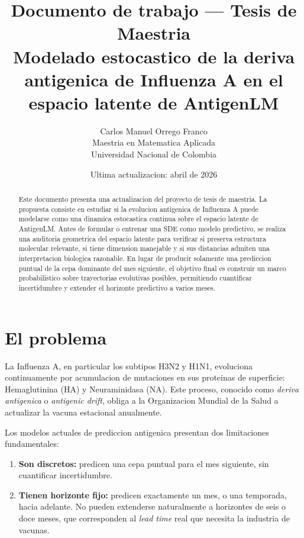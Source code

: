 \documentclass[12pt,letterpaper]{article}
\title{\textbf{Documento de trabajo --- Tesis de Maestria}\\[0.4em]
\large Modelado estocastico de la deriva antigenica de Influenza A en el espacio latente de AntigenLM}
\author{Carlos Manuel Orrego Franco\\
Maestria en Matematica Aplicada\\
Universidad Nacional de Colombia}
\date{Ultima actualizacion: abril de 2026}
\begin{document}
\maketitle

\begin{abstract}
Este documento presenta una actualizacion del proyecto de tesis de maestria. La propuesta consiste en estudiar si la evolucion antigenica de Influenza A puede modelarse como una dinamica estocastica continua sobre el espacio latente de AntigenLM. Antes de formular o entrenar una SDE como modelo predictivo, se realiza una auditoria geometrica del espacio latente para verificar si preserva estructura molecular relevante, si tiene dimension manejable y si sus distancias admiten una interpretacion biologica razonable. En lugar de producir solamente una prediccion puntual de la cepa dominante del mes siguiente, el objetivo final es construir un marco probabilistico sobre trayectorias evolutivas posibles, permitiendo cuantificar incertidumbre y extender el horizonte predictivo a varios meses.
\end{abstract}

\tableofcontents
\newpage

\section{El problema}

La Influenza A, en particular los subtipos H3N2 y H1N1, evoluciona continuamente por acumulacion de mutaciones en sus proteinas de superficie: Hemaglutinina (HA) y Neuraminidasa (NA). Este proceso, conocido como \emph{deriva antigenica} o \emph{antigenic drift}, obliga a la Organizacion Mundial de la Salud a actualizar la vacuna estacional anualmente.

Los modelos actuales de prediccion antigenica presentan dos limitaciones fundamentales:

\begin{enumerate}[label=\textbf{\arabic*.}, leftmargin=2.2em]
    \item \textbf{Son discretos:} predicen una cepa puntual para el mes siguiente, sin cuantificar incertidumbre.
    \item \textbf{Tienen horizonte fijo:} predicen exactamente un mes, o una temporada, hacia adelante. No pueden extenderse naturalmente a horizontes de seis o doce meses, que corresponden al \emph{lead time} real que necesita la industria de vacunas.
\end{enumerate}
\end{document}
